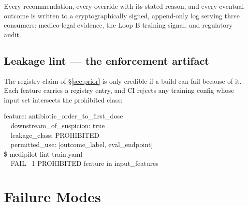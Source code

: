 \documentclass[10pt,a4paper,twocolumn]{article}
\begin{document}
\vspace{3pt}
Every recommendation, every override with its stated reason, and every eventual
outcome is written to a cryptographically signed, append-only log serving three
consumers: medico-legal evidence, the Loop B training signal, and regulatory audit.

\subsection{Leakage lint --- the enforcement artifact}
The registry claim of \S\ref{sec:prior} is only credible if a build can fail because
of it. Each feature carries a registry entry, and CI rejects any training config whose
input set intersects the prohibited class:

\begin{tcolorbox}[mpcode]
feature: antibiotic\_order\_to\_first\_dose\\
\ \ downstream\_of\_suspicion: \textcolor{AccPurple}{true}\\
\ \ leakage\_class: \textcolor{AccPurple}{PROHIBITED}\\
\ \ permitted\_use: [outcome\_label, eval\_endpoint]\\[3pt]
\$ medipilot-lint train.yaml\\
\ \ \textcolor{AccPurple}{FAIL} \ 1 PROHIBITED feature in input\_features
\end{tcolorbox}

\section{Failure Modes}
\end{document}
